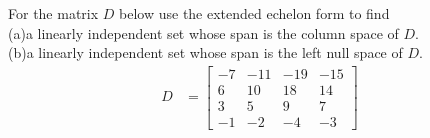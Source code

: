 For the matrix $D$ below use the extended echelon form to find\\
(a)\quad a linearly independent set whose span is the column space of $D$.\\
(b)\quad a linearly independent set whose span is the left null space of $D$.
%
\begin{align*}
D&=
\begin{bmatrix}
 -7 & -11 & -19 & -15\\
 6 & 10 & 18 & 14 \\
 3 & 5 & 9 & 7 \\
-1 & -2 & -4 & -3
\end{bmatrix}
\end{align*}
%
